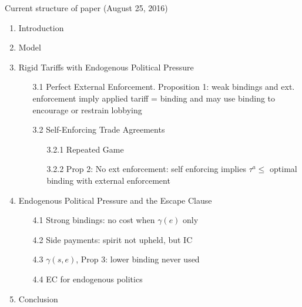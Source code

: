 \documentclass[12pt]{article}
\newcommand{\ga}{\gamma}
\begin{document}
\newpage
Current structure of paper (August 25, 2016)
\begin{enumerate}
	\item Introduction
	\item Model
	\item Rigid Tariffs with Endogenous Political Pressure
		\begin{itemize}
			\item[3.1] Perfect External Enforcement. Proposition 1: weak bindings and ext. enforcement imply applied tariff = binding and may use binding to encourage or restrain lobbying
			\item[3.2] Self-Enforcing Trade Agreements
				\begin{itemize}
					\item[3.2.1] Repeated Game
					\item[3.2.2] Prop 2: No ext enforcement: self enforcing implies $\tau^a \leq$ optimal binding with external enforcement
				\end{itemize}
		\end{itemize}
	\item Endogenous Political Pressure and the Escape Clause
		\begin{itemize}
			\item[4.1] Strong bindings: no cost when $\ga(e)$ only
			\item[4.2] Side payments: spirit not upheld, but IC
			\item[4.3] $\ga(s,e)$, Prop 3: lower binding never used
			\item[4.4] EC for endogenous politics
		\end{itemize}
	\item Conclusion
\end{enumerate}
\end{document}
